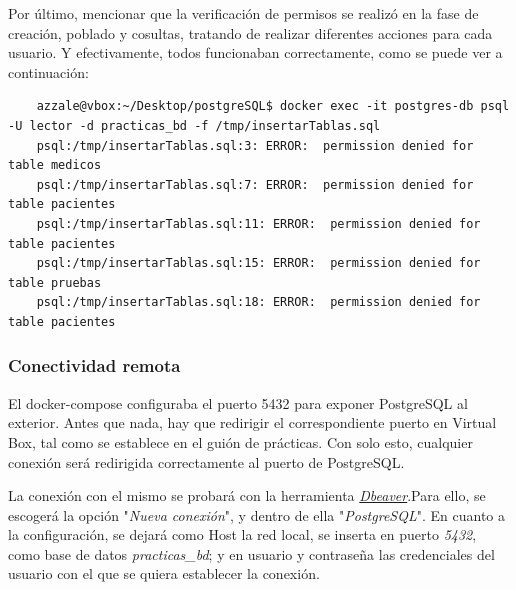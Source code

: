 \documentclass{article}
\begin{document}
Por último, mencionar que la verificación de permisos se realizó en la fase de creación, poblado y cosultas, tratando de realizar diferentes acciones para cada usuario. Y efectivamente, todos funcionaban correctamente, como se puede ver a continuación:
\begin{tcolorbox}[colback=black, coltext=white, fontupper=\ttfamily, title=Terminal]
\begin{verbatim}
    azzale@vbox:~/Desktop/postgreSQL$ docker exec -it postgres-db psql -U lector -d practicas_bd -f /tmp/insertarTablas.sql
    psql:/tmp/insertarTablas.sql:3: ERROR:  permission denied for table medicos
    psql:/tmp/insertarTablas.sql:7: ERROR:  permission denied for table pacientes
    psql:/tmp/insertarTablas.sql:11: ERROR:  permission denied for table pacientes
    psql:/tmp/insertarTablas.sql:15: ERROR:  permission denied for table pruebas
    psql:/tmp/insertarTablas.sql:18: ERROR:  permission denied for table pacientes
\end{verbatim}
\end{tcolorbox}



\subsubsection{Conectividad remota}

El docker-compose configuraba el puerto 5432 para exponer PostgreSQL al exterior.  Antes que nada, hay que redirigir el correspondiente puerto en Virtual Box, tal como se establece en el guión de prácticas. Con solo esto, cualquier conexión será redirigida correctamente al puerto de PostgreSQL.

La conexión con el mismo se probará con la herramienta \textit{\textcolor{blue}{\href{https://dbeaver.com/download/enterprise/}{Dbeaver}}}.Para ello, se escogerá la opción "\textit{Nueva conexión}", y dentro de ella "\textit{PostgreSQL}". En cuanto a la configuración, se dejará como Host la red local, se inserta en puerto \textit{5432}, como base de datos \textit{practicas\_bd}; y en usuario y contraseña las credenciales del usuario con el que se quiera establecer la conexión. 
\end{document}
